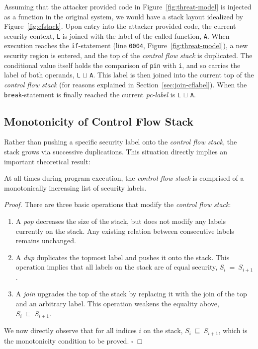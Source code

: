 \documentclass{llncs}
\begin{document}
Assuming that the attacker provided code in Figure~\ref{fig:threat-model} is injected as a function in the original system, we would have a stack layout idealized by Figure~\ref{fig:cfstack}.
Upon entry into the attacker provided code, the current security context, \texttt{L} is joined with the label of the called function, \texttt{A}.
When execution reaches the \texttt{if}-statement (line \texttt{0004}, Figure~\ref{fig:threat-model}), a new security region is entered, and the top of the \textit{control flow stack} is duplicated.
The conditional value itself holds the comparison of \texttt{pin} with \texttt{i}, and so carries the label of both operands, \texttt{L} $\sqcup$ \texttt{A}.
This label is then joined into the current top of the \textit{control flow stack} (for reasons explained in Section~\ref{sec:join-cflabel}).
When the \texttt{break}-statement is finally reached the current \textit{pc-label} is \texttt{L} $\sqcup$ \texttt{A}.

\subsection{Monotonicity of Control Flow Stack}

Rather than pushing a specific security label onto the \textit{control flow stack}, the stack grows via successive duplications.
This situation directly implies an important theoretical result: 
\begin{theorem}
  At all times during program execution, the \textit{control flow stack} is comprised of a monotonically increasing list of security labels.
\end{theorem}
\begin{proof}
 There are three basic operations that modify the \textit{control flow stack}:
 \begin{enumerate}
  \item A \textit{pop} decreases the size of the stack, but does not modify any labels currently on the stack. Any existing relation between consecutive labels remains unchanged.
  \item A \textit{dup} duplicates the topmost label and pushes it onto the stack. This operation implies that all labels on the stack are of equal security, $S_i~=~S_{i+1}$.
  \item A \textit{join} upgrades the top of the stack by replacing it with the join of the top and an arbitrary label. This operation weakens the equality above, $S_i~\sqsubseteq~S_{i+1}$.
 \end{enumerate}
 We now directly observe that for all indices $i$ on the stack, $S_i~\sqsubseteq~S_{i+1}$, which is the monotonicity condition to be proved. $\square$
\end{proof}
\end{document}
